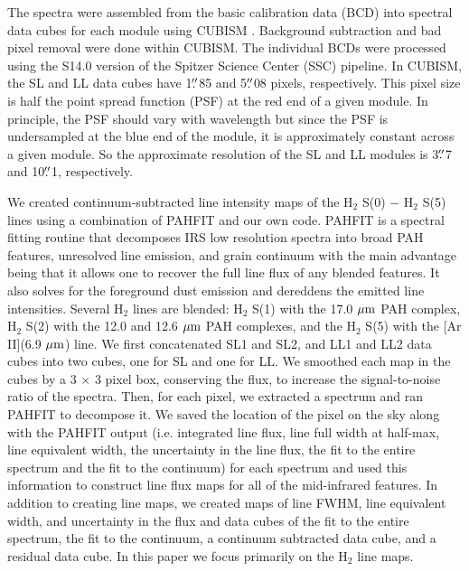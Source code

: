 \documentclass[manuscript]{aastex}
\begin{document}
The spectra were assembled from the basic calibration data (BCD) into
spectral data cubes for each module using CUBISM \citep{ken03, smi04}.
Background subtraction and bad pixel removal were done within CUBISM.
The individual BCDs were processed using the S14.0 version of
the Spitzer Science Center (SSC) pipeline.  In CUBISM, the SL and LL
data cubes have 1$\mbox{$.\!\!^{\prime\prime}$}$85 and 5$\mbox{$.\!\!^{\prime\prime}$}$08 pixels,
respectively.  This pixel size is half the point spread function (PSF)
at the red end of a given module.  In
principle, the PSF should vary with wavelength but since the PSF is
undersampled at the blue end of the module, it is approximately
constant across a given module.  So the approximate resolution of the
SL and LL modules is 3$\mbox{$.\!\!^{\prime\prime}$}$7 and 10$\mbox{$.\!\!^{\prime\prime}$}$1, respectively.

We created continuum-subtracted line intensity maps of the $\mathrm{H_2}$
S(0) $-$ $\mathrm{H_2}$ S(5) lines using a combination of PAHFIT
\citep{smi07} and our own code.  PAHFIT is a spectral fitting routine
that decomposes IRS low resolution spectra into broad PAH features, unresolved line emission, and grain continuum with the main advantage
being that it allows one to recover the full line flux of any blended
features.  It also solves for the foreground dust emission and 
dereddens the emitted line intensities.  
Several $\mathrm{H_2}$ lines are blended:
$\mathrm{H_2}$ S(1) with the 17.0 $\mbox{$\mu$m}$ PAH complex,
$\mathrm{H_2}$ S(2) with the 12.0 and 12.6 $\mbox{$\mu$m}$ PAH complexes, and the
$\mathrm{H_2}$ S(5) with the [Ar II](6.9 $\mbox{$\mu$m}$) line.  We first
concatenated SL1 and SL2, and LL1 and LL2 data cubes into two cubes,
one for SL and one for LL.  We smoothed each map in the cubes by a 3
$\times$ 3 pixel box, conserving the flux, to increase the
signal-to-noise ratio of the spectra.  Then, for each pixel, we
extracted a spectrum and ran PAHFIT to decompose it.  We saved the
location of the pixel on the sky along with the PAHFIT output (i.e. integrated line flux, line full width at half-max, line equivalent width, the uncertainty in the line flux, the fit to the entire spectrum and the fit to the continuum) for each spectrum and used this information to construct line flux maps for all of the mid-infrared features.  In addition to creating line maps, we created maps of line FWHM, line equivalent width, and uncertainty in the flux and data cubes of the fit to the entire spectrum, the fit to the continuum, a continuum subtracted data cube, and a residual data cube.  In this paper we focus primarily on the H$_2$ line maps.
\end{document}
